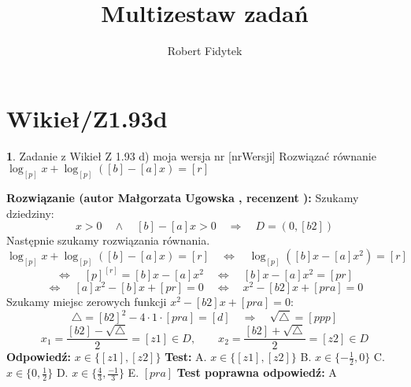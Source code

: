 \documentclass[12pt, a4paper]{article}
\title{Multizestaw zadań}
\author{Robert Fidytek}
\date{}
\theoremstyle{definition} %
\newtheorem{zad}{}
\newcommand{\kategoria}[1]{\section{#1}} %
\newcommand{\zadStart}[1]{\begin{zad}#1\newline} %
\newcommand{\zadStop}{\end{zad}}   %
\newcommand{\rozwStart}[2]{\noindent \textbf{Rozwiązanie (autor #1 , recenzent #2): }\newline} %
\newcommand{\rozwStop}{\newline}                                            %
\newcommand{\odpStart}{\noindent \textbf{Odpowiedź:}\newline}    %
\newcommand{\odpStop}{\newline}                                             %
\newcommand{\testStart}{\noindent \textbf{Test:}\newline} %
\newcommand{\testStop}{\newline} %
\newcommand{\kluczStart}{\noindent \textbf{Test poprawna odpowiedź:}\newline} %
\newcommand{\kluczStop}{\newline} %
\begin{document}
\maketitle


\kategoria{Wikieł/Z1.93d}
\zadStart{Zadanie z Wikieł Z 1.93 d) moja wersja nr [nrWersji]}
Rozwiązać równanie $\log_{[p]}{x} + \log_{[p]}{([b]-[a]x)} = [r]$
\zadStop
\rozwStart{Małgorzata Ugowska}{}
Szukamy dziedziny:
$$x>0 \quad \land \quad [b]-[a]x >0 \quad \Longrightarrow \quad D = (0, [b2])$$
Następnie szukamy rozwiązania równania.
$$\log_{[p]}{x} + \log_{[p]}{([b]-[a]x)} = [r] \quad \Longleftrightarrow \quad \log_{[p]}{([b]x-[a]x^2)} = [r]$$
$$ \Longleftrightarrow \quad [p]^{[r]} = [b]x-[a]x^2 \quad \Longleftrightarrow \quad [b]x-[a]x^2 = [pr]$$
$$ \Longleftrightarrow \quad [a]x^2 - [b]x +[pr]= 0 \quad \Longleftrightarrow \quad x^2 - [b2]x +[pra]= 0 $$
Szukamy miejsc zerowych funkcji $x^2 - [b2]x +[pra]= 0 $:
$$ \bigtriangleup = [b2]^2-4 \cdot 1 \cdot [pra] = [d] \quad  \Longrightarrow \quad \sqrt{\bigtriangleup}=[ppp]$$
$$ x_1=\frac{[b2]-\sqrt{\bigtriangleup}}{2} = [z1] \in D, \qquad x_2=\frac{[b2]+\sqrt{\bigtriangleup}}{2} = [z2] \in D$$
\rozwStop
\odpStart
$x \in \{[z1], [z2]\}$
\odpStop
\testStart
A. $x \in \{[z1], [z2]\}$
B. $x \in \{-\frac{1}{2}, 0\}$
C. $x \in \{0, \frac{1}{2}\}$
D. $x \in \{\frac{4}{3}, \frac{-1}{3}\}$
E. $[pra]$
\testStop
\kluczStart
A
\kluczStop
\end{document}
